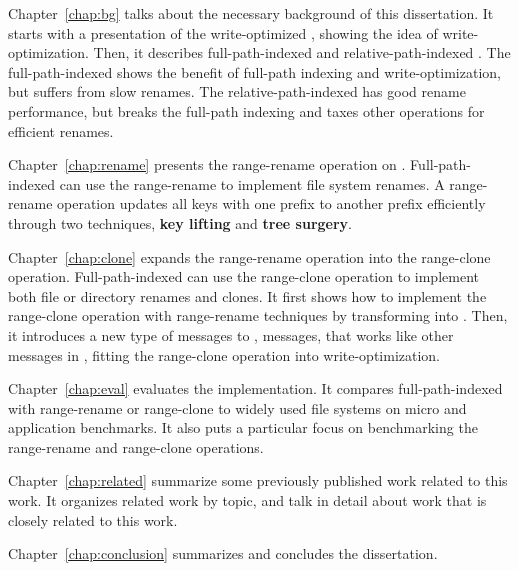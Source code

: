 Chapter~\ref{chap:bg} talks about the necessary background of this dissertation.
It starts with a presentation of the write-optimized \bets,
showing the idea of write-optimization.
Then, it describes full-path-indexed \betrfs and relative-path-indexed \betrfs.
The full-path-indexed \betrfs shows the benefit of full-path indexing and
write-optimization, but suffers from slow renames.
The relative-path-indexed \betrfs has good rename performance, but breaks the
full-path indexing and taxes other operations for efficient renames.

Chapter~\ref{chap:rename} presents the range-rename operation on \bets.
Full-path-indexed \betrfs can use the range-rename to implement file system
renames.
A range-rename operation updates all keys with one prefix to another prefix
efficiently through two techniques,
\textbf{key lifting} and \textbf{tree surgery}.

Chapter~\ref{chap:clone} expands the range-rename operation into the
range-clone operation.
Full-path-indexed \betrfs can use the range-clone operation to implement both
file or directory renames and clones.
It first shows how to implement the range-clone operation with range-rename
techniques by transforming \bets into \bedags.
Then, it introduces a new type of messages to \bedags, \goto messages,
that works like other messages in \bedags,
fitting the range-clone operation into write-optimization.

Chapter~\ref{chap:eval} evaluates the implementation.
It compares full-path-indexed \betrfs with range-rename or range-clone to
widely used file systems on micro and application benchmarks.
It also puts a particular focus on benchmarking the range-rename and range-clone
operations.

Chapter~\ref{chap:related} summarize some previously published work related to
this work.
It organizes related work by topic, and talk in detail about work that is closely
related to this work.

Chapter~\ref{chap:conclusion} summarizes and concludes the dissertation.

